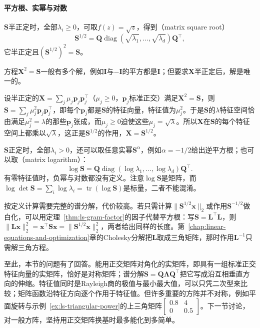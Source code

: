 \paragraph{平方根、实幂与对数}

$\bm S$半正定时，全部$\lambda_i\geq0$，可取$f(z)=\sqrt z$，得到（matrix square root）
\[
 \bm S^{1/2}=\bm Q\operatorname{diag}(\sqrt{\lambda_1},\ldots,\sqrt{\lambda_d})\bm Q^\top ,
\]
它半正定且$(\bm S^{1/2})^2=\bm S$。

方程$\bm X^2=\bm S$一般有多个解，例如$\bm I$与$-\bm I$的平方都是$\bm I$；但要求$\bm X$半正定后，解是唯一的。

设半正定的$\bm X=\sum_j\mu_j\bm p_j\bm p_j^\top$（$\mu_j\geq0$，$\bm p_j$标准正交）满足$\bm X^2=\bm S$，则$\bm S=\sum_j\mu_j^2\bm p_j\bm p_j^\top$，即每个$\bm p_j$都是$\bm S$的特征向量，特征值为$\mu_j^2$。于是$\bm S$的$\lambda$特征空间恰由满足$\mu_j^2=\lambda$的那些$\bm p_j$张成，而$\mu_j\geq0$迫使这些$\mu_j=\sqrt\lambda$。所以$\bm X$在$\bm S$的每个特征空间上都乘以$\sqrt\lambda$，这正是$\bm S^{1/2}$的作用，$\bm X=\bm S^{1/2}$。

$\bm S$正定时，全部$\lambda_i>0$，还可以取任意实幂$\bm S^\alpha$，例如$\alpha=-1/2$给出逆平方根；也可以取（matrix logarithm）：
\[
 \log\bm S=\bm Q\operatorname{diag}(\log\lambda_1,\ldots,\log\lambda_d)\bm Q^\top.
\]
有零特征值时，负幂与对数都没有定义。注意$\log\bm S$是矩阵，而$\log\det\bm S=\sum_i\log\lambda_i=\operatorname{tr}(\log\bm S)$是标量，二者不能混淆。

按定义计算需要完整的谱分解，代价较高。若只需计算$\lVert\bm S^{1/2}\bm x\rVert_2$或作用$\bm S^{-1/2}$做白化，可以用定理~\ref{thm:ls-gram-factor}的因子代替平方根：写$\bm S=\bm L^\top\bm L$，则$\lVert\bm L\bm x\rVert_2^2=\bm x^\top\bm S\bm x=\lVert\bm S^{1/2}\bm x\rVert_2^2$，两者给出同样的长度。第~\ref{chap:linear-equations-and-optimization}章的Cholesky分解把$\bm L$取成三角矩阵，那时作用$\bm L^{-1}$只需解三角方程。

至此，本节的问题有了回答。能用正交矩阵对角化的实矩阵，即具有一组标准正交特征向量的实矩阵，恰好是对称矩阵；谱分解$\bm S=\bm Q\bm\Lambda\bm Q^\top$把它写成沿互相垂直方向的伸缩。特征值同时是Rayleigh商的极值与最小最大值，可以只凭二次型来比较；矩阵函数沿特征方向逐个作用于特征值。但许多重要的方阵并不对称，例如平面旋转与示例~\ref{ex:ls-triangular-power}的上三角矩阵$\left[\begin{smallmatrix}0.8&4\\0&0.5\end{smallmatrix}\right]$。下一节讨论，对一般方阵，坚持用正交矩阵换基时最多能化到多简单。
